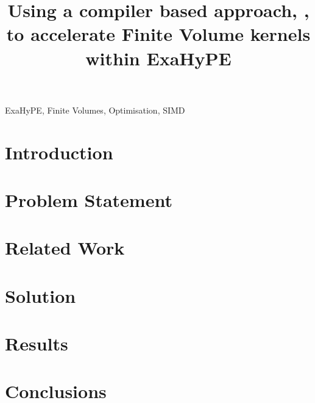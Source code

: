 \documentclass[12pt,a4paper]{article}
\title{Using a compiler based approach, \phlat, to accelerate Finite Volume kernels within ExaHyPE}
\author{} %
\date{}
\newif\iftesting
\newcommand{\testingbreak}{\iftesting \pagebreak \fi}%
\begin{document}
\maketitle

\begin{abstract}

\end{abstract}

\begin{keywords}
ExaHyPE, Finite Volumes, Optimisation, SIMD
\end{keywords}

\testingbreak
\section{Introduction}


\testingbreak
\section{Problem Statement}\label{sec:problem_statement}


\testingbreak
\section{Related Work}



\testingbreak
\section{Solution}
\label{sec:methodology}

%

\testingbreak
\section{Results}
\label{sec:results}


\testingbreak
\section{Conclusions}


\testingbreak
%
\printbibliography

\iftesting
\pagebreak

\fi
\end{document}
